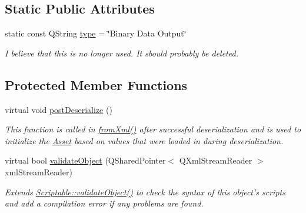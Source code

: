 \subsection*{Static Public Attributes}
\begin{DoxyCompactItemize}
\item 
\hypertarget{class_picto_1_1_binary_data_output_a9f8bb6ec83b390c96c2e66f5dbf5aa4b}{static const Q\-String \hyperlink{class_picto_1_1_binary_data_output_a9f8bb6ec83b390c96c2e66f5dbf5aa4b}{type} = \char`\"{}Binary Data Output\char`\"{}}\label{class_picto_1_1_binary_data_output_a9f8bb6ec83b390c96c2e66f5dbf5aa4b}

\begin{DoxyCompactList}\small\item\em I believe that this is no longer used. It sbould probably be deleted. \end{DoxyCompactList}\end{DoxyCompactItemize}
\subsection*{Protected Member Functions}
\begin{DoxyCompactItemize}
\item 
virtual void \hyperlink{class_picto_1_1_binary_data_output_a325c73f5b09be8f4aa258a3eb3dc696a}{post\-Deserialize} ()
\begin{DoxyCompactList}\small\item\em This function is called in \hyperlink{class_picto_1_1_asset_a8bed4da09ecb1c07ce0dab313a9aba67}{from\-Xml()} after successful deserialization and is used to initialize the \hyperlink{class_picto_1_1_asset}{Asset} based on values that were loaded in during deserialization. \end{DoxyCompactList}\item 
\hypertarget{class_picto_1_1_binary_data_output_a2ec13542cada30caa5e0f84c3d4aa6c8}{virtual bool \hyperlink{class_picto_1_1_binary_data_output_a2ec13542cada30caa5e0f84c3d4aa6c8}{validate\-Object} (Q\-Shared\-Pointer$<$ Q\-Xml\-Stream\-Reader $>$ xml\-Stream\-Reader)}\label{class_picto_1_1_binary_data_output_a2ec13542cada30caa5e0f84c3d4aa6c8}

\begin{DoxyCompactList}\small\item\em Extends \hyperlink{class_picto_1_1_scriptable_ab6e2944c43a3b5d418bf7b251594386d}{Scriptable\-::validate\-Object()} to check the syntax of this object's scripts and add a compilation error if any problems are found. \end{DoxyCompactList}\end{DoxyCompactItemize}
